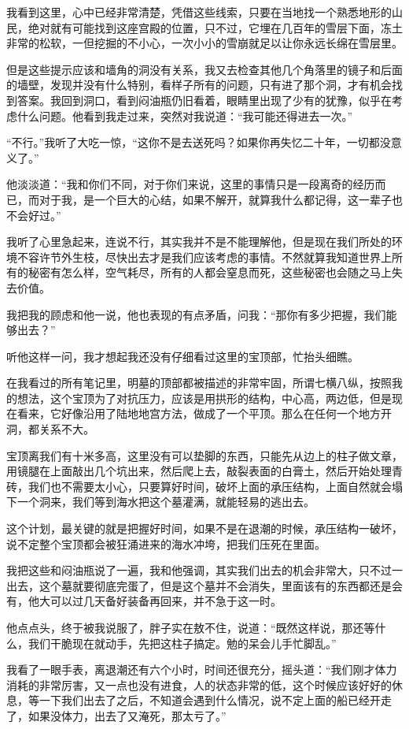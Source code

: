 我看到这里，心中已经非常清楚，凭借这些线索，只要在当地找一个熟悉地形的山民，绝对就有可能找到这座宫殿的位置，只不过，它埋在几百年的雪层下面，冻土非常的松软，一但挖掘的不小心，一次小小的雪崩就足以让你永远长绵在雪层里。

但是这些提示应该和墙角的洞没有关系，我又去检查其他几个角落里的镜子和后面的墙壁，发现并没有什么特别，看样子所有的问题，只有进了那个洞，才有机会找到答案。我回到洞口，看到闷油瓶仍旧看着，眼睛里出现了少有的犹豫，似乎在考虑什么问题。他看到我走过来，突然对我说道：“我可能还得进去一次。”

“不行。”我听了大吃一惊，“这你不是去送死吗？如果你再失忆二十年，一切都没意义了。”

他淡淡道：“我和你们不同，对于你们来说，这里的事情只是一段离奇的经历而已，而对于我，是一个巨大的心结，如果不解开，就算我什么都记得，这一辈子也不会好过。”

我听了心里急起来，连说不行，其实我并不是不能理解他，但是现在我们所处的环境不容许节外生枝，尽快出去才是我们应该考虑的事情。不然就算我知道世界上所有的秘密有怎么样，空气耗尽，所有的人都会窒息而死，这些秘密也会随之马上失去价值。

我把我的顾虑和他一说，他也表现的有点矛盾，问我：“那你有多少把握，我们能够出去？”

听他这样一问，我才想起我还没有仔细看过这里的宝顶部，忙抬头细瞧。

在我看过的所有笔记里，明墓的顶部都被描述的非常牢固，所谓七横八纵，按照我的想法，这个宝顶为了对抗压力，应该是用拱形的结构，中心高，两边低，但是现在看来，它好像沿用了陆地地宫方法，做成了一个平顶。那么在任何一个地方开洞，都关系不大。

宝顶离我们有十米多高，这里没有可以垫脚的东西，只能先从边上的柱子做文章，用镜腿在上面敲出几个坑出来，然后爬上去，敲裂表面的白膏土，然后开始处理青砖，我们也不需要太小心，只要算好时间，破坏上面的承压结构，上面自然就会塌下一个洞来，我们等到海水把这个墓灌满，就能轻易的逃出去。

这个计划，最关键的就是把握好时间，如果不是在退潮的时候，承压结构一破坏，说不定整个宝顶都会被狂涌进来的海水冲垮，把我们压死在里面。

我把这些和闷油瓶说了一遍，我和他强调，其实我们出去的机会非常大，只不过一出去，这个墓就要彻底完蛋了，但是这个墓并不会消失，里面该有的东西都还是会有，他大可以过几天备好装备再回来，并不急于这一时。

他点点头，终于被我说服了，胖子实在敖不住，说道：“既然这样说，那还等什么，我们干脆现在就动手，先把这柱子搞定。勉的呆会儿手忙脚乱。”

我看了一眼手表，离退潮还有六个小时，时间还很充分，摇头道：“我们刚才体力消耗的非常厉害，又一点也没有进食，人的状态非常的低，这个时候应该好好的休息，等一下我们出去了之后，不知道会遇到什么情况，说不定上面的船已经开走了，如果没体力，出去了又淹死，那太亏了。”

